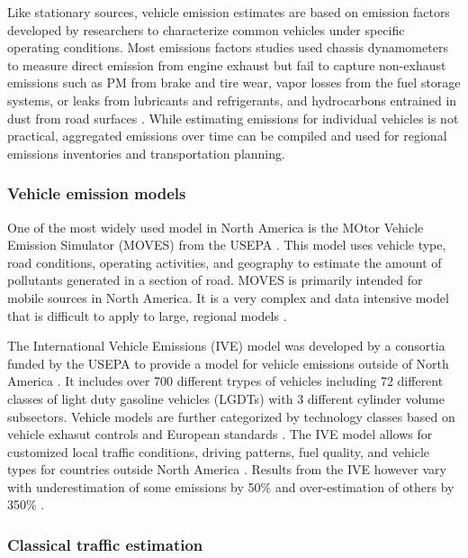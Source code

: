 Like stationary sources, vehicle emission estimates are based on emission factors developed by researchers to characterize common vehicles under specific operating conditions. Most emissions factors studies used chassis dynamometers to measure direct emission from engine exhaust but fail to capture non-exhaust emissions such as PM from brake and tire wear, vapor losses from the fuel storage systems, or leaks from lubricants and refrigerants, and hydrocarbons entrained in dust from road surfaces \citep{Kam2012, Franco2013, Freeman2015a}. While estimating emissions for individual vehicles is not practical, aggregated emissions over time can be compiled and used for regional emissions inventories and transportation planning.

\subsubsection{Vehicle emission models} \label{sssec:VehEmissionModels}

One of the most widely used model in North America is the MOtor Vehicle Emission Simulator (MOVES) from the USEPA \cite{MOVES2014a}. This model uses vehicle type, road conditions, operating activities, and geography to estimate the amount of pollutants generated in a section of road. MOVES is primarily intended for mobile sources in North America. It is a very complex and data intensive model that is difficult to apply to large, regional models \cite{Zhang2011}.

The International Vehicle Emissions (IVE) model was developed by a consortia funded by the USEPA to provide a model for vehicle emissions outside of North America \cite{IVE2008}. It includes over 700 different trypes of vehicles including 72 different classes of light duty gasoline vehicles (LGDTs) with 3 different cylinder volume subsectors. Vehicle models are further categorized by technology classes based on vehicle exhasut controls and European standards \cite{Davis2005}. The IVE model allows for customized local traffic conditions, driving patterns, fuel quality, and vehicle types for countries outside North America \cite{Davis2010}. Results from the IVE however vary with underestimation of some emissions by 50\% and over-estimation of others by 350\% \cite{Hui2007}.

\subsubsection{Classical traffic estimation} \label{sssec:ClassicalTraffic}

